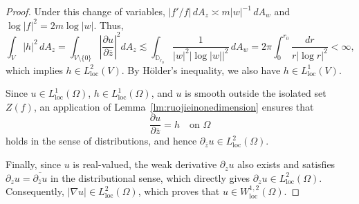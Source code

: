 \documentclass[12pt,twoside]{amsart}
\numberwithin{equation}{section}
\numberwithin{definition}{section} %
\begin{document}
\begin{proof}
Under this change of variables, $|f'/f|\,dA_z \asymp m|w|^{-1}\,dA_w$ and $\log|f|^2 = 2m\log|w|$. Thus,
\begin{equation}\label{eq:lp_for_h}
\int_V |h|^2\,dA_z = \int_{V \setminus \{0\}} \left| \frac{\partial u}{\partial \bar{z}} \right|^2 dA_z \lesssim \int_{\mathbb{D}_{r_0}} \frac{1}{|w|^2 |\log |w||^2}\,dA_w = 2\pi \int_0^{r_0} \frac{dr}{r |\log r|^2} < \infty,
\end{equation}
which implies $h \in L^2_{\mathrm{loc}}(V)$. By H\"older's inequality, we also have $h \in L^1_{\mathrm{loc}}(V)$. 

Since $u \in L^1_{\mathrm{loc}}(\Omega)$, $h \in L^1_{\mathrm{loc}}(\Omega)$, and $u$ is smooth outside the isolated set $Z(f)$, an application of Lemma~\ref{lm:ruojieinonedimension} ensures that
\[
\frac{\partial u}{\partial \bar{z}} = h \quad \text{on } \Omega
\]
holds in the sense of distributions, and hence $\partial_{\bar{z}} u \in L^2_{\mathrm{loc}}(\Omega)$. 

Finally, since $u$ is real-valued, the weak derivative $\partial_z u$ also exists and satisfies $\partial_z u = \overline{\partial_{\bar{z}} u}$ in the distributional sense, which directly gives $\partial_z u \in L^2_{\mathrm{loc}}(\Omega)$. Consequently, $|\nabla u| \in L^2_{\mathrm{loc}}(\Omega)$, which proves that $u \in W^{1,2}_{\mathrm{loc}}(\Omega)$.
\end{proof}





\end{document}
